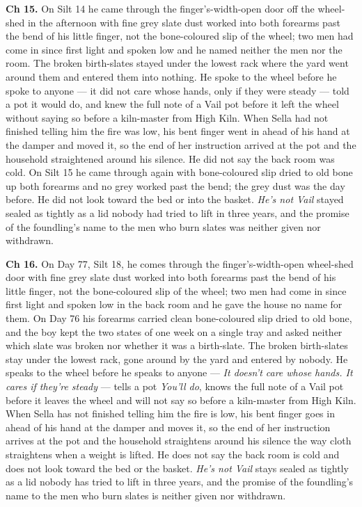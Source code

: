 \documentclass{design/chronicle}
\begin{document}
{\textbf{Ch 15.} On Silt 14 he came through the finger’s-width-open door off the wheel-shed in the afternoon with fine grey slate dust worked into both forearms past the bend of his little finger, not the bone-coloured slip of the wheel; two men had come in since first light and spoken low and he named neither the men nor the room. The broken birth-slates stayed under the lowest rack where the yard went around them and entered them into nothing. He spoke to the wheel before he spoke to anyone --- it did not care whose hands, only if they were steady --- told a pot it would do, and knew the full note of a Vail pot before it left the wheel without saying so before a kiln-master from High Kiln. When Sella had not finished telling him the fire was low, his bent finger went in ahead of his hand at the damper and moved it, so the end of her instruction arrived at the pot and the household straightened around his silence. He did not say the back room was cold. On Silt 15 he came through again with bone-coloured slip dried to old bone up both forearms and no grey worked past the bend; the grey dust was the day before. He did not look toward the bed or into the basket. \emph{He’s not Vail} stayed sealed as tightly as a lid nobody had tried to lift in three years, and the promise of the foundling’s name to the men who burn slates was neither given nor withdrawn.

\textbf{Ch 16.} On Day 77, Silt 18, he comes through the finger’s-width-open wheel-shed door with fine grey slate dust worked into both forearms past the bend of his little finger, not the bone-coloured slip of the wheel; two men had come in since first light and spoken low in the back room and he gave the house no name for them. On Day 76 his forearms carried clean bone-coloured slip dried to old bone, and the boy kept the two states of one week on a single tray and asked neither which slate was broken nor whether it was a birth-slate. The broken birth-slates stay under the lowest rack, gone around by the yard and entered by nobody. He speaks to the wheel before he speaks to anyone --- \emph{It doesn’t care whose hands. It cares if they’re steady} --- tells a pot \emph{You’ll do}, knows the full note of a Vail pot before it leaves the wheel and will not say so before a kiln-master from High Kiln. When Sella has not finished telling him the fire is low, his bent finger goes in ahead of his hand at the damper and moves it, so the end of her instruction arrives at the pot and the household straightens around his silence the way cloth straightens when a weight is lifted. He does not say the back room is cold and does not look toward the bed or the basket. \emph{He’s not Vail} stays sealed as tightly as a lid nobody has tried to lift in three years, and the promise of the foundling’s name to the men who burn slates is neither given nor withdrawn.

}
\end{document}
